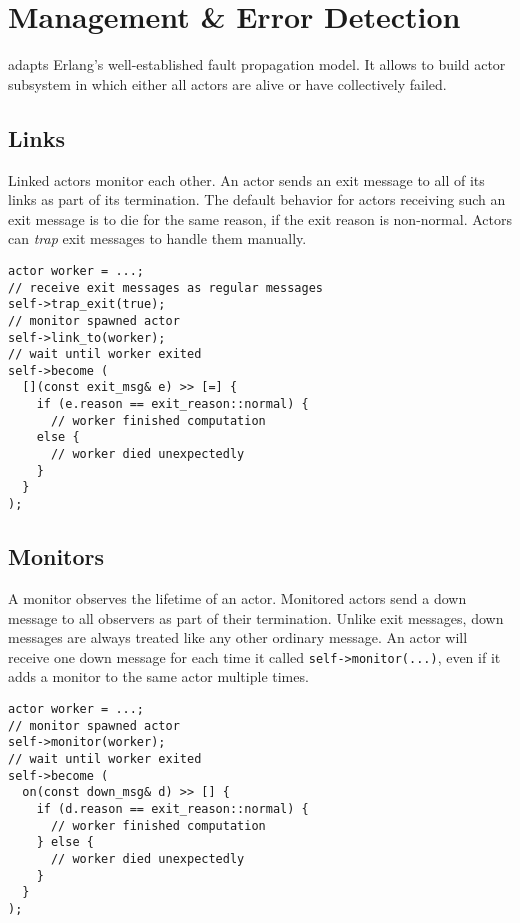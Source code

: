 \section{Management \& Error Detection}

\libcppa adapts Erlang's well-established fault propagation model.
It allows to build actor subsystem in which either all actors are alive or have collectively failed.

\subsection{Links}

Linked actors monitor each other.
An actor sends an exit message to all of its links as part of its termination.
The default behavior for actors receiving such an exit message is to die for the same reason, if the exit reason is non-normal.
Actors can \textit{trap} exit messages to handle them manually.

\begin{lstlisting}
actor worker = ...;
// receive exit messages as regular messages
self->trap_exit(true);
// monitor spawned actor
self->link_to(worker);
// wait until worker exited
self->become (
  [](const exit_msg& e) >> [=] {
    if (e.reason == exit_reason::normal) {
      // worker finished computation
    else {
      // worker died unexpectedly
    }
  }
);
\end{lstlisting}

\subsection{Monitors}
\label{Sec::Management::Monitors}

A monitor observes the lifetime of an actor.
Monitored actors send a down message to all observers as part of their termination.
Unlike exit messages, down messages are always treated like any other ordinary message.
An actor will receive one down message for each time it called \lstinline^self->monitor(...)^, even if it adds a monitor to the same actor multiple times.

\begin{lstlisting}
actor worker = ...;
// monitor spawned actor
self->monitor(worker);
// wait until worker exited
self->become (
  on(const down_msg& d) >> [] {
    if (d.reason == exit_reason::normal) {
      // worker finished computation
    } else {
      // worker died unexpectedly
    }
  }
);
\end{lstlisting}

